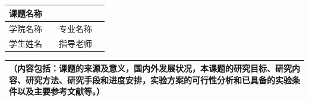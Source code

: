{\thispagestyle{empty}
\newpage
\par\song{}
\song\xiaosi{}
\vfill
\hfill\song{} \hspace*{5em} \\
\hspace*{12cm} \song{}\\

\vspace*{15pt}

\hfill\song{} \hspace*{5em} \\
\hspace*{12cm}  \song{}\\
\thispagestyle{empty}

\newpage
{}
\begin{center}
\hei{}
\end{center}
\begin{table}[h]
  \centering\sihao
  \begin{tabularx}{\textwidth}{|c|p{}|c|X|}
     \hline
     课题名称 & \multicolumn{3}{c|}{} \\ \hline
     学院名称 & \centering {} & 专业名称 & \centering {} \tabularnewline \hline
     学生姓名 & \centering {} & 指导老师 & \centering {} \tabularnewline \hline
   \end{tabularx}
   \vspace*{-1em}
   \centering\xiaosi
   \begin{tabularx}{\textwidth}{|X|}
     {   （内容包括：课题的来源及意义，国内外发展状况，本课题的研究目标、研究内容、研究方法、研究手段和进度安排，实验方案的可行性分析和已具备的实验条件以及主要参考文献等。）
     }
       \vspace*{395pt}\\
       \hline
   \end{tabularx}
\end{table}
\thispagestyle{empty}

}
